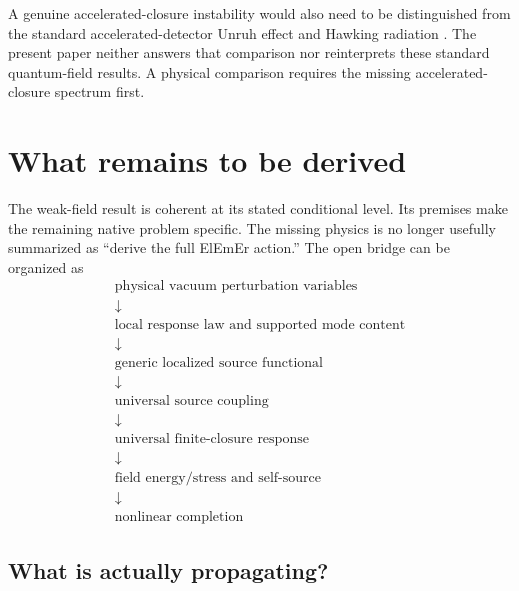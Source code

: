 \documentclass[11pt]{article}
\newcommand{\ElEmEr}{\mbox{ElEmEr}}
\theoremstyle{plain}
\theoremstyle{remark}
\begin{document}
A genuine accelerated-closure instability would also need to be distinguished
from the standard accelerated-detector Unruh effect \cite{Unruh1976}
and Hawking radiation \cite{Hawking1975}.
The present paper neither answers that comparison nor reinterprets these
standard quantum-field results.  A physical comparison requires the missing
accelerated-closure spectrum first.

\section{What remains to be derived}
\label{sec:open}

The weak-field result is coherent at its stated conditional level.  Its premises
make the remaining native problem specific.  The missing physics is no longer usefully summarized as ``derive the full
\ElEmEr{} action.''  The open bridge can be organized as
\begin{equation}
\boxed{
\begin{array}{c}
\text{physical vacuum perturbation variables}\\[2pt]
\downarrow\\[-1pt]
\text{local response law and supported mode content}\\[2pt]
\downarrow\\[-1pt]
\text{generic localized source functional}\\[2pt]
\downarrow\\[-1pt]
\text{universal source coupling}\\[2pt]
\downarrow\\[-1pt]
\text{universal finite-closure response}\\[2pt]
\downarrow\\[-1pt]
\text{field energy/stress and self-source}\\[2pt]
\downarrow\\[-1pt]
\text{nonlinear completion}
\end{array}}
\label{eq:missing-bridge-hierarchy}
\end{equation}

\subsection{What is actually propagating?}
\end{document}
